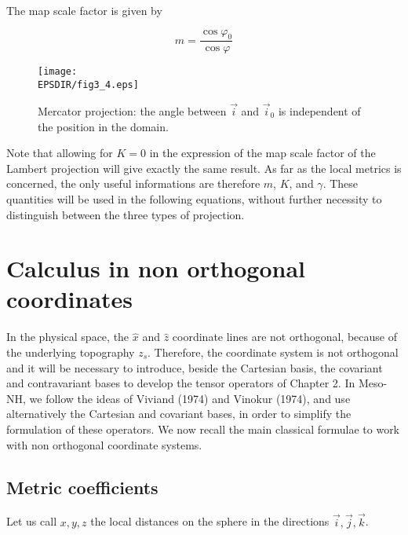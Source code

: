 The map scale factor is given by

\begin{equation}
m = \dfrac{\cos\varphi _{0} }{\cos\varphi }
\end{equation}

\begin{figure}[!ht]
\centerline{\texttt{[image: \\EPSDIR/fig3\_4.eps]}}
\caption{Mercator projection: the angle between $\vec{i}$ and $\vec{i}_0$
is independent of the position in the domain.}
\label{mercator}
\end{figure}

Note that allowing for $K=0$ in the expression of the map scale factor of
the Lambert projection will give exactly the same result. As far as the
local metrics is concerned, the only useful informations are therefore
$m$, $K$, and $\gamma$. These quantities
 will be used in the following equations, without further
necessity to distinguish between the three types of projection.

\section{Calculus in non orthogonal coordinates}

In the physical space, the $\widehat{x}$ and $\widehat{z}$ coordinate lines
are not orthogonal, because of the underlying topography $z_s$. Therefore,
the coordinate system is not orthogonal and it will be necessary to introduce,
beside the Cartesian basis, the covariant and contravariant bases to
develop the tensor operators of Chapter 2. In Meso-NH, we follow the ideas
of Viviand (1974) and Vinokur (1974), and use alternatively the
Cartesian and covariant bases, in order to simplify the formulation of
these operators. We now recall the main classical formulae to work with
non orthogonal coordinate systems.

\subsection{Metric coefficients}

Let us call $x,y,z$ the local distances on the sphere in the directions
$\vec{i},\vec{j},\vec{k}$.

